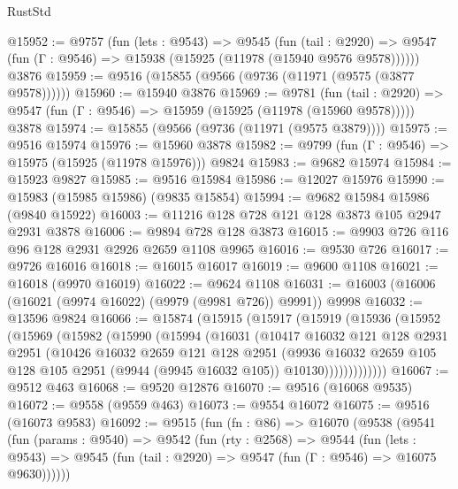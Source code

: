 \begin{lexlean}{RustStd}
\begin{coremodule}
@15952 := @9757
    (fun (lets : @9543) =>
    @9545
      (fun (tail : @2920) =>
      @9547 (fun (Γ : @9546) => @15938 (@15925 (@11978 (@15940 @9576 @9578))))))
    @3876
@15959 := @9516 (@15855 (@9566 (@9736 (@11971 (@9575 (@3877 @9578))))))
@15960 := @15940 @3876
@15969 := @9781
    (fun (tail : @2920) => @9547 (fun (Γ : @9546) => @15959 (@15925 (@11978 (@15960 @9578)))))
    @3878
@15974 := @15855 (@9566 (@9736 (@11971 (@9575 @3879))))
@15975 := @9516 @15974
@15976 := @15960 @3878
@15982 := @9799 (fun (Γ : @9546) => @15975 (@15925 (@11978 @15976))) @9824
@15983 := @9682 @15974
@15984 := @15923 @9827
@15985 := @9516 @15984
@15986 := @12027 @15976
@15990 := @15983 (@15985 @15986) (@9835 @15854)
@15994 := @9682 @15984 @15986 (@9840 @15922)
@16003 := @11216 @128 @728 @121 @128 @3873 @105 @2947 @2931 @3878
@16006 := @9894 @728 @128 @3873
@16015 := @9903 @726 @116 @96 @128 @2931 @2926 @2659 @1108 @9965
@16016 := @9530 @726
@16017 := @9726 @16016
@16018 := @16015 @16017
@16019 := @9600 @1108
@16021 := @16018 (@9970 @16019)
@16022 := @9624 @1108
@16031 := @16003 (@16006 (@16021 (@9974 @16022) (@9979 (@9981 @726)) @9991)) @9998
@16032 := @13596 @9824
@16066 := @15874
    (@15915
      (@15917
        (@15919
          (@15936
            (@15952
              (@15969
                (@15982
                  (@15990
                    (@15994
                      (@16031
                        (@10417
                          @16032
                          @121
                          @128
                          @2931
                          @2951
                          (@10426
                            @16032
                            @2659
                            @121
                            @128
                            @2951
                            (@9936
                              @16032
                              @2659
                              @105
                              @128
                              @105
                              @2951
                              (@9944 (@9945 @16032 @105))
                              @10130)))))))))))))
@16067 := @9512 @463
@16068 := @9520 @12876
@16070 := @9516 (@16068 @9535)
@16072 := @9558 (@9559 @463)
@16073 := @9554 @16072
@16075 := @9516 (@16073 @9583)
@16092 := @9515
    (fun (fn : @86) =>
    @16070
      (@9538
        (@9541
          (fun (params : @9540) =>
          @9542
            (fun (rty : @2568) =>
            @9544
              (fun (lets : @9543) =>
              @9545 (fun (tail : @2920) => @9547 (fun (Γ : @9546) => @16075 @9630))))))

\end{coremodule}
\end{lexlean}
